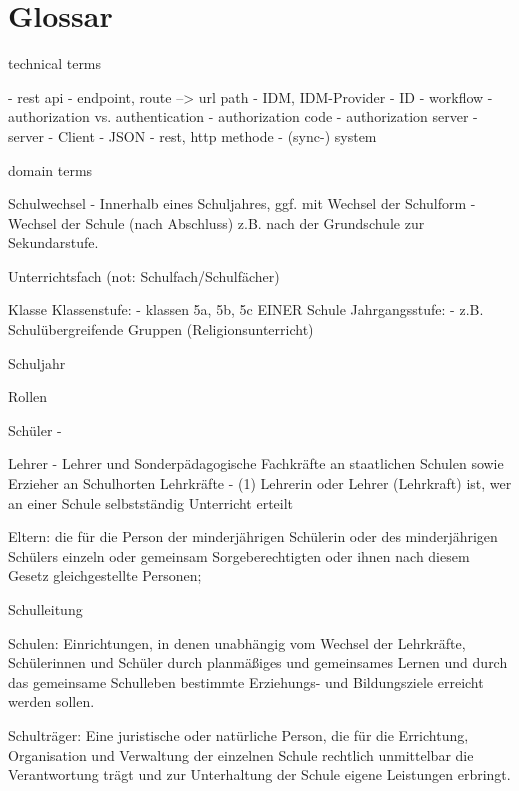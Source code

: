 \section{Glossar}
\label{glossary}



technical terms

- rest api 
- endpoint, route --> url path
- IDM, IDM-Provider
- ID
- workflow
- authorization vs. authentication 
- authorization code
- authorization server 
- server
- Client
- JSON
- rest, http methode
- (sync-) system

domain terms





Schulwechsel
- Innerhalb eines Schuljahres, ggf. mit Wechsel der Schulform
- Wechsel der Schule (nach Abschluss) z.B. nach der Grundschule zur Sekundarstufe.




Unterrichtsfach (not: Schulfach/Schulfächer)

Klasse
Klassenstufe: 
- klassen 5a, 5b, 5c EINER Schule
Jahrgangsstufe: 
 - z.B. Schulübergreifende Gruppen (Religionsunterricht)

Schuljahr

Rollen

Schüler
- 

Lehrer
- Lehrer und Sonderpädagogische Fachkräfte an staatlichen Schulen sowie Erzieher an
Schulhorten 
Lehrkräfte
- (1) Lehrerin oder Lehrer (Lehrkraft) ist, wer an einer Schule selbstständig Unterricht erteilt

Eltern:
die für die Person der minderjährigen Schülerin oder des minderjährigen Schülers einzeln oder gemeinsam Sorgeberechtigten oder ihnen nach diesem Gesetz gleichgestellte Personen;

Schulleitung


Schulen:
Einrichtungen, in denen unabhängig vom Wechsel der Lehrkräfte, Schülerinnen und Schüler durch planmäßiges und gemeinsames Lernen und durch das gemeinsame Schulleben bestimmte Erziehungs- und Bildungsziele erreicht werden sollen.


Schulträger:
Eine juristische oder natürliche Person, die für die Errichtung, Organisation und Verwaltung der einzelnen Schule rechtlich unmittelbar die Verantwortung trägt und zur Unterhaltung der Schule eigene Leistungen erbringt.
